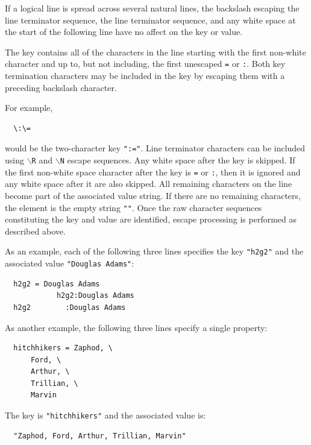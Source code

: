 \documentclass[a4paper,fleqn]{report}
\begin{document}
If a logical line is spread across several natural lines, the
backslash escaping the line terminator sequence, the line terminator
sequence, and any white space at the start of the following line have
no affect on the key or value.

The key contains all of the characters in the line starting with the
first non-white character and up to, but not including, the first
unescaped \texttt{=} or \texttt{:}. Both key termination characters
may be included in the key by escaping them with a preceding backslash
character.

\pagebreak

For example,

\begin{lstlisting}
  \:\=
\end{lstlisting}

would be the two-character key \texttt{":="}. Line terminator
characters can be included using \texttt{$\backslash$R} and
\texttt{$\backslash$N} escape sequences. Any white space after the key
is skipped. If the first non-white space character after the key is
\texttt{=} or \texttt{:}, then it is ignored and any white space after
it are also skipped. All remaining characters on the line become part
of the associated value string. If there are no remaining characters,
the element is the empty string \texttt{""}. Once the raw character
sequences constituting the key and value are identified, escape
processing is performed as described above.

As an example, each of the following three lines specifies the key
\texttt{"h2g2"} and the associated value \texttt{"Douglas Adams"}:

\begin{lstlisting}
  h2g2 = Douglas Adams
            h2g2:Douglas Adams
  h2g2        :Douglas Adams  
\end{lstlisting}

As another example, the following three lines specify a single
property:

\begin{lstlisting}
  hitchhikers = Zaphod, \
      Ford, \
      Arthur, \
      Trillian, \
      Marvin  
\end{lstlisting}

The key is \texttt{"hitchhikers"} and the associated value is:

\begin{lstlisting}
  "Zaphod, Ford, Arthur, Trillian, Marvin" 
\end{lstlisting}
\end{document}
